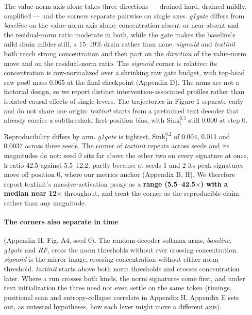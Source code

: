 \documentclass{article}
\begin{document}
The value-norm axis alone takes three directions --- drained hard, drained mildly, amplified --- and the corners separate pairwise on single axes. \textit{g1gate} differs from \textit{baseline} on the value-norm axis alone: concentration absent or near-absent and the residual-norm ratio moderate in both, while the gate makes the baseline's mild drain milder still, a 15--19\% drain rather than none. \textit{sigmoid} and \textit{textinit} both reach strong concentration and then part on the \textit{direction} of the value-norm move and on the residual-norm ratio. The \textit{sigmoid} corner is relative: its concentration is row-normalized over a shrinking raw gate budget, with top-head raw pos0 mass 0.065 at the final checkpoint (Appendix D). The arms are not a factorial design, so we report distinct intervention-associated profiles rather than isolated causal effects of single levers. The trajectories in Figure 1 separate early and do not share one origin: \textit{textinit} starts from a pretrained text decoder that already carries a subthreshold first-position bias, with $\mathrm{Sink}^{0.3}_{1}$ still 0.000 at step 0.

Reproducibility differs by arm. \textit{g1gate} is tightest, $\mathrm{Sink}^{0.2}_{1}$ of 0.004, 0.011 and 0.0037 across three seeds. The corner of \textit{textinit} repeats across seeds and its magnitudes do not: seed 0 sits far above the other two on every signature at once, h-ratio 42.5 against 5.5--12.2, partly because at seeds 1 and 2 its peak signatures move off position 0, where our metrics anchor (Appendix B, H). We therefore report textinit's massive-activation proxy as a \textbf{range (5.5--42.5$\times$) with a median near 12$\times$} throughout, and treat the corner as the reproducible claim rather than any magnitude.

\paragraph{The corners also separate in time} (Appendix H, Fig. A4, seed 0). The random-decoder softmax arms, \textit{baseline}, \textit{g1gate} and \textit{RF}, cross the norm thresholds without ever crossing concentration. \textit{sigmoid} is the mirror image, crossing concentration without either norm threshold. \textit{textinit} starts above both norm thresholds and crosses concentration later. Where a run crosses both kinds, the norm signatures come first, and under text initialization the three need not even settle on the same token (timings, positional scan and entropy-collapse correlate in Appendix H, Appendix E sets out, as untested hypotheses, how each lever might move a different axis).
\end{document}
